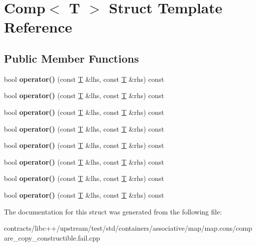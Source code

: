 \hypertarget{struct_comp}{}\section{Comp$<$ T $>$ Struct Template Reference}
\label{struct_comp}
\subsection*{Public Member Functions}
\begin{DoxyCompactItemize}
\item 
\mbox{\label{struct_comp_a540f78687208d9ee450fbed189f3338d}} 
bool {\bfseries operator()} (const \mbox{\hyperlink{struct_t}{T}} \&lhs, const \mbox{\hyperlink{struct_t}{T}} \&rhs) const
\item 
\mbox{\label{struct_comp_a540f78687208d9ee450fbed189f3338d}} 
bool {\bfseries operator()} (const \mbox{\hyperlink{struct_t}{T}} \&lhs, const \mbox{\hyperlink{struct_t}{T}} \&rhs) const
\item 
\mbox{\label{struct_comp_a540f78687208d9ee450fbed189f3338d}} 
bool {\bfseries operator()} (const \mbox{\hyperlink{struct_t}{T}} \&lhs, const \mbox{\hyperlink{struct_t}{T}} \&rhs) const
\item 
\mbox{\label{struct_comp_a540f78687208d9ee450fbed189f3338d}} 
bool {\bfseries operator()} (const \mbox{\hyperlink{struct_t}{T}} \&lhs, const \mbox{\hyperlink{struct_t}{T}} \&rhs) const
\item 
\mbox{\label{struct_comp_a540f78687208d9ee450fbed189f3338d}} 
bool {\bfseries operator()} (const \mbox{\hyperlink{struct_t}{T}} \&lhs, const \mbox{\hyperlink{struct_t}{T}} \&rhs) const
\item 
\mbox{\label{struct_comp_a540f78687208d9ee450fbed189f3338d}} 
bool {\bfseries operator()} (const \mbox{\hyperlink{struct_t}{T}} \&lhs, const \mbox{\hyperlink{struct_t}{T}} \&rhs) const
\item 
\mbox{\label{struct_comp_a540f78687208d9ee450fbed189f3338d}} 
bool {\bfseries operator()} (const \mbox{\hyperlink{struct_t}{T}} \&lhs, const \mbox{\hyperlink{struct_t}{T}} \&rhs) const
\item 
\mbox{\label{struct_comp_a540f78687208d9ee450fbed189f3338d}} 
bool {\bfseries operator()} (const \mbox{\hyperlink{struct_t}{T}} \&lhs, const \mbox{\hyperlink{struct_t}{T}} \&rhs) const
\end{DoxyCompactItemize}


The documentation for this struct was generated from the following file\+:\begin{DoxyCompactItemize}
\item 
contracts/libc++/upstream/test/std/containers/associative/map/map.\+cons/compare\+\_\+copy\+\_\+constructible.\+fail.\+cpp\end{DoxyCompactItemize}
